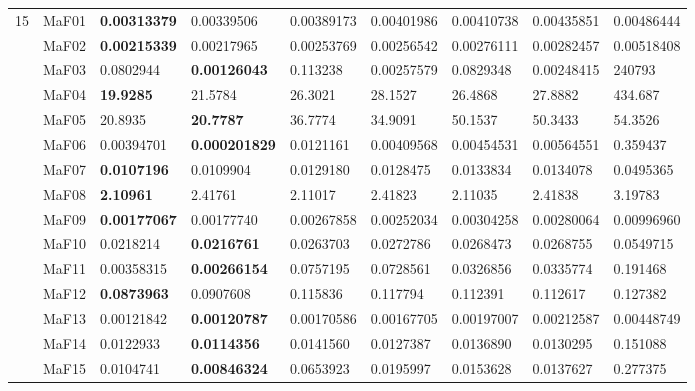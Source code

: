 \documentclass[]{article}
\begin{document}
\begin{landscape}
\begin{table}
\begin{footnotesize}
\begin{tabular}{|l|l|l|l|l|l|l|l|l|}
\multirow{15}{*}{15} & MaF01 & \cellcolor{gray95} {\bf 0.00313379} & \cellcolor{gray95} 0.00339506 & 0.00389173 & 0.00401986 & 0.00410738 & 0.00435851 & 0.00486444\\
 & MaF02 & \cellcolor{gray95} {\bf 0.00215339} & \cellcolor{gray95} 0.00217965 & 0.00253769 & 0.00256542 & 0.00276111 & 0.00282457 & 0.00518408\\
 & MaF03 & 0.0802944 & \cellcolor{gray95} {\bf 0.00126043} & 0.113238 & 0.00257579 & 0.0829348 & 0.00248415 & 240793\\
 & MaF04 & \cellcolor{gray95} {\bf 19.9285} & \cellcolor{gray95} 21.5784 & 26.3021 & 28.1527 & 26.4868 & 27.8882 & 434.687\\
 & MaF05 & \cellcolor{gray95} 20.8935 & \cellcolor{gray95} {\bf 20.7787} & 36.7774 & 34.9091 & 50.1537 & 50.3433 & 54.3526\\
 & MaF06 & 0.00394701 & \cellcolor{gray95} {\bf 0.000201829} & 0.0121161 & 0.00409568 & 0.00454531 & 0.00564551 & 0.359437\\
 & MaF07 & \cellcolor{gray95} {\bf 0.0107196} & \cellcolor{gray95} 0.0109904 & 0.0129180 & 0.0128475 & 0.0133834 & 0.0134078 & 0.0495365\\
 & MaF08 & \cellcolor{gray95} {\bf 2.10961} & \cellcolor{gray95} 2.41761 & \cellcolor{gray95} 2.11017 & \cellcolor{gray95} 2.41823 & 2.11035 & 2.41838 & 3.19783\\
 & MaF09 & \cellcolor{gray95} {\bf 0.00177067} & \cellcolor{gray95} 0.00177740 & 0.00267858 & 0.00252034 & 0.00304258 & 0.00280064 & 0.00996960\\
 & MaF10 & \cellcolor{gray95} 0.0218214 & \cellcolor{gray95} {\bf 0.0216761} & 0.0263703 & 0.0272786 & 0.0268473 & 0.0268755 & 0.0549715\\
 & MaF11 & \cellcolor{gray95} 0.00358315 & \cellcolor{gray95} {\bf 0.00266154} & 0.0757195 & 0.0728561 & 0.0326856 & 0.0335774 & 0.191468\\
 & MaF12 & \cellcolor{gray95} {\bf 0.0873963} & \cellcolor{gray95} 0.0907608 & 0.115836 & 0.117794 & 0.112391 & 0.112617 & 0.127382\\
 & MaF13 & \cellcolor{gray95} 0.00121842 & \cellcolor{gray95} {\bf 0.00120787} & 0.00170586 & 0.00167705 & 0.00197007 & 0.00212587 & 0.00448749\\
 & MaF14 & \cellcolor{gray95} 0.0122933 & \cellcolor{gray95} {\bf 0.0114356} & 0.0141560 & \cellcolor{gray95} 0.0127387 & 0.0136890 & \cellcolor{gray95} 0.0130295 & 0.151088\\
 & MaF15 & \cellcolor{gray95} 0.0104741 & \cellcolor{gray95} {\bf 0.00846324} & 0.0653923 & 0.0195997 & 0.0153628 & \cellcolor{gray95} 0.0137627 & 0.277375\\
\hline
\end{tabular}
\end{footnotesize}
\end{table}
\end{landscape}
\end{document}
